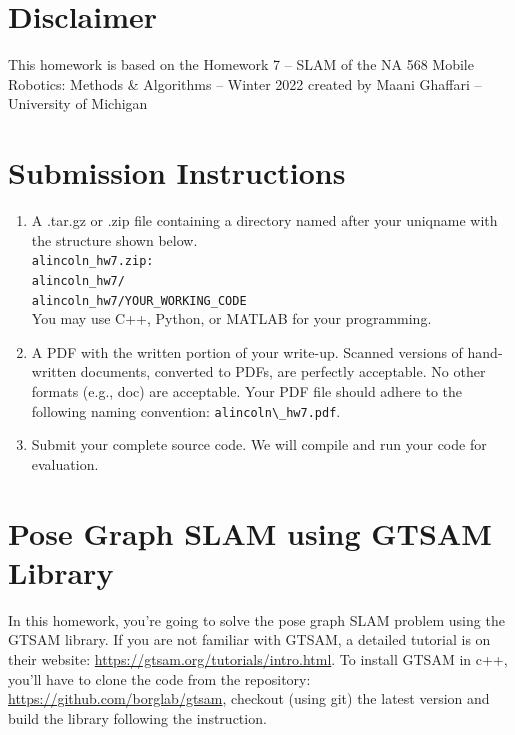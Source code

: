 \documentclass[tp]{lcc}
\begin{document}
\maketitle


\section{Disclaimer}
This homework is based on the Homework 7 -- SLAM of the NA 568 Mobile Robotics: Methods \& Algorithms -- Winter 2022 created by Maani Ghaffari -- University of Michigan

\section*{Submission Instructions}

\begin{enumerate}
    \item A .tar.gz or .zip file containing a directory named after your uniqname with the structure shown below. \\
    \lstinline[style=bash]{alincoln_hw7.zip:} \\
    \lstinline[style=bash]{alincoln_hw7/} \\
    \lstinline[style=bash]{alincoln_hw7/YOUR_WORKING_CODE} \\
    You may use C++, Python, or MATLAB for your programming.

    \item A PDF with the written portion of your write-up. Scanned versions of hand-written documents, converted to PDFs, are perfectly acceptable. No other formats (e.g., doc) are acceptable. Your PDF file should adhere to the following naming convention: \lstinline[style=bash]{alincoln\_hw7.pdf}.

    \item Submit your complete source code. We will compile and run your code for evaluation.
\end{enumerate}

\section{Pose Graph SLAM using GTSAM Library}
In this homework, you’re going to solve the pose graph SLAM problem using the GTSAM library. If you are not familiar with GTSAM, a detailed tutorial is on their website: \url{https://gtsam.org/tutorials/intro.html}. To install GTSAM in c++, you’ll have to clone the code from the repository: \url{https://github.com/borglab/gtsam}, checkout (using git) the latest version and build the library following the instruction.
\end{document}

